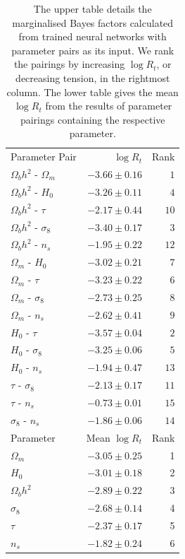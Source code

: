 \documentclass[%
 reprint,
 amsmath,amssymb,
 aps,
]{revtex4-2}
\begin{document}
\begin{table}
\begin{ruledtabular}
\begin{tabular}{l r r}
    Parameter Pair & $\log R_t$ & Rank \\
    \colrule
    $\Omega_b h^2$ - $\Omega_m$ &	$-3.66 \pm 0.16$ & $1$  \\
    $\Omega_b h^2$ - $H_0$      &	$-3.26 \pm 0.11$ & $4$  \\
    $\Omega_b h^2$ - $\tau$     &	$-2.17 \pm 0.44$ & $10$ \\
    $\Omega_b h^2$ - $\sigma_8$ &	$-3.40 \pm 0.17$ & $3$  \\
    $\Omega_b h^2$ - $n_s$      &	$-1.95 \pm 0.22$ & $12$ \\
    $\Omega_m$ - $H_0$          &	$-3.02 \pm 0.21$ & $7$  \\
    $\Omega_m$ - $\tau$         &	$-3.23 \pm 0.22$ & $6$  \\
    $\Omega_m$ - $\sigma_8$     &	$-2.73 \pm 0.25$ & $8$  \\
    $\Omega_m$ - $n_s$          &	$-2.62 \pm 0.41$ & $9$  \\
    $H_0$ - $\tau$              &	$-3.57 \pm 0.04$ & $2$  \\
    $H_0$ - $\sigma_8$          &	$-3.25 \pm 0.06$ & $5$  \\
    $H_0$ - $n_s$               &	$-1.94 \pm 0.47$ & $13$ \\
    $\tau$ - $\sigma_8$         &	$-2.13 \pm 0.17$ & $11$ \\
    $\tau$ - $n_s$              &	$-0.73 \pm 0.01$ & $15$ \\
    $\sigma_8$ - $n_s$          &	$-1.86 \pm 0.06$ & $14$ \\
    \hline \hline
    Parameter & Mean $\log R_t$ & Rank \\
    \colrule
    $\Omega_m$      & $-3.05 \pm 0.25$ & 1 \\
    $H_0$           & $-3.01 \pm 0.18$ & 2 \\
    $\Omega_b h^2$  & $-2.89 \pm 0.22$ & 3 \\
    $\sigma_8$      & $-2.68 \pm 0.14$ & 4 \\
    $\tau$          & $-2.37 \pm 0.17$ & 5 \\
    $n_s$           & $-1.82 \pm 0.24$ & 6 \\
\end{tabular}
\end{ruledtabular}
    
\caption{The upper table details the marginalised Bayes factors calculated from trained neural networks with parameter pairs as its input. We rank the pairings by increasing $\log R_t$, or decreasing tension, in the rightmost column. The lower table gives the mean $\log R_t$ from the results of parameter pairings containing the respective parameter.}
\label{table:pairwise}
\end{table}
\end{document}
